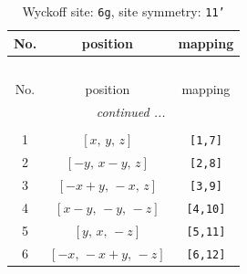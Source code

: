 \documentclass[fleqn,8pt]{jsarticle}
\begin{document}
\begin{longtable}{ccc}
\caption{Wyckoff site: {\tt 6g}, site symmetry: {\tt 11'}}
 \\
 \hline \hline
No. & position & mapping \\ \hline \endfirsthead

\multicolumn{2}{l}{\tablename\ \thetable{}} \\
 \hline \hline
No. & position & mapping \\ \hline \endhead

 \hline \hline
\multicolumn{2}{r}{\footnotesize\it continued ...} \\ \endfoot

 \hline \hline
\multicolumn{2}{r}{} \\ \endlastfoot

1 & $\left[ x,\, y,\, z \right]$ & {\tt [1,7]} \\ \hline
2 & $\left[ - y,\, x - y,\, z \right]$ & {\tt [2,8]} \\ \hline
3 & $\left[ - x + y,\, - x,\, z \right]$ & {\tt [3,9]} \\ \hline
4 & $\left[ x - y,\, - y,\, - z \right]$ & {\tt [4,10]} \\ \hline
5 & $\left[ y,\, x,\, - z \right]$ & {\tt [5,11]} \\ \hline
6 & $\left[ - x,\, - x + y,\, - z \right]$ & {\tt [6,12]} \\
\end{longtable}
\end{document}
